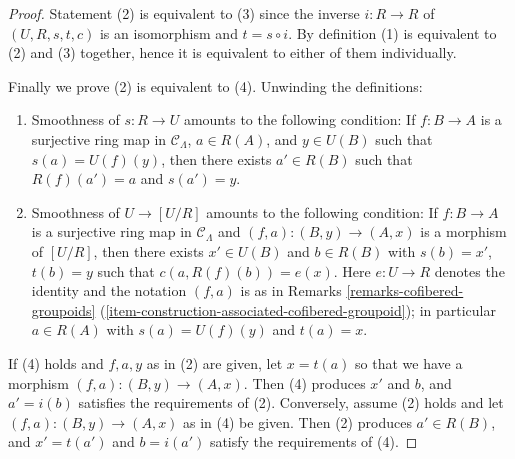\documentclass[10pt,a4paper]{amsart}
\theoremstyle{plain}
\theoremstyle{definition}
\theoremstyle{remark}
\numberwithin{equation}{subsection}
\begin{document}
\begin{proof}
Statement (2) is equivalent to (3) since the inverse $i: R \to R$ of
$(U, R, s, t, c)$ is an isomorphism and $t = s \circ i$. By definition (1) is
equivalent to (2) and (3) together, hence it is equivalent to either of them
individually.

\medskip\noindent
Finally we prove (2) is equivalent to (4). Unwinding the definitions:
\begin{enumerate}
\item[(2)] Smoothness of $s: R \to U$ amounts to the following
condition: If $f: B \to A$ is a surjective ring map in
$\mathcal{C}_\Lambda$, $a \in R(A)$, and $y \in U(B)$ such that
$s(a) = U(f)(y)$, then there exists $a' \in R(B)$ such that
$R(f)(a') = a$ and $s(a') = y$.
\item[(4)] Smoothness of $U \to [U/R]$ amounts to the following
condition: If $f: B \to A$ is a surjective ring map in
$\mathcal{C}_\Lambda$ and $(f, a) : (B, y) \to (A, x)$
is a morphism of $[U/R]$, then there exists $x' \in U(B)$ and
$b \in R(B)$ with $s(b) = x'$, $t(b) = y$
such that $c(a, R(f)(b)) = e(x)$.  Here $e : U \to R$ denotes the
identity and the notation $(f, a)$ is as in Remarks
\ref{remarks-cofibered-groupoids}
(\ref{item-construction-associated-cofibered-groupoid});
in particular $a \in R(A)$ with $s(a) = U(f)(y)$ and $t(a) = x$.
\end{enumerate}
If (4) holds and $f, a, y$ as in (2) are given, let $x = t(a)$ so that
we have a morphism $(f, a): (B, y) \to (A, x)$.
Then (4) produces $x'$ and $b$, and $a' = i(b)$ satisfies the requirements
of (2). Conversely, assume (2) holds and let $(f, a): (B, y) \to (A, x)$
as in (4) be given. Then (2) produces $a' \in R(B)$, and $x' = t(a')$ and
$b = i(a')$ satisfy the requirements of (4).
\end{proof}
\end{document}

